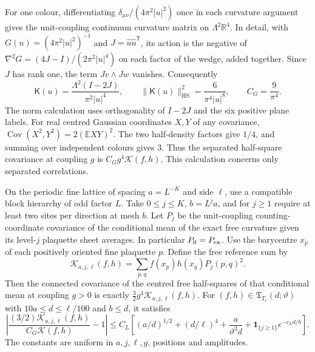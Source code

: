 \documentclass[11pt,letterpaper,reqno]{amsart}
\makeatletter
\numberwithin{equation}{section}
\theoremstyle{definition}
\newcommand{\ms@minorstart}{%
  \pushQED{\qed}\renewcommand{\qedsymbol}{$\blacksquare$}}
\newenvironment{proposition}[1][]{\ms@minorstart\ms@proposition[#1]}
  {\popQED\endms@proposition}
\theoremstyle{remark}
\makeatother
\begin{document}
For one colour, differentiating
\(\delta_{\mu\nu}/(4\pi^2|u|^2)\) once in each curvature argument
gives the unit-coupling continuum curvature matrix on
\(\Lambda^2\mathbb R^4\).
In detail, with \(G(u)=(4\pi^2|u|^2)^{-1}\) and
\(J=\widehat u\widehat u^{\mathsf T}\), its action is
the negative of \(\nabla^2G=(4J-I)/(2\pi^2|u|^4)\)
on each factor of the wedge, added together. Since \(J\)
has rank one, the term \(Jv\wedge Jw\) vanishes. Consequently
\begin{equation}\label{fp:eq-free-coefficient}
 \mathsf K(u)=\frac{\Lambda^2(I-2J)}{\pi^2|u|^4},\qquad
 \|\mathsf K(u)\|_{\mathrm{HS}}^2=\frac{6}{\pi^4|u|^8},\qquad
 C_G=\frac{9}{\pi^4}.
\end{equation}
The norm calculation uses orthogonality of \(I-2J\) and the six
positive plane labels. For real centred Gaussian coordinates \(X,Y\)
of any covariance, \(\operatorname{Cov}(X^2,Y^2)=2(\mathbb E XY)^2\).
The two half-density factors give \(1/4\), and summing over
independent colours gives \(3\). Thus the separated half-square
covariance at coupling \(g\) is \(C_Gg^4\mathcal K(f,h)\).
This calculation concerns only separated correlations.

\begin{proposition}[Free reference at a blocked scale]
\label{fp:prop-free-reference}
On the periodic fine lattice of spacing \(a=L^{-K}\) and side \(\ell\),
use a compatible block hierarchy of odd factor \(L\).
Take \(0\le j\le K\), \(b=L^ja\), and for \(j\ge1\) require at
least two sites per direction at mesh \(b\). Let \(P_j\) be
the unit-coupling counting-coordinate covariance of the
conditional mean of the exact free curvature given its
level-\(j\) plaquette sheet averages. In particular \(P_0=P_{\rm ex}\).
Use the barycentre \(x_p\) of each positively oriented fine
plaquette \(p\). Define the free reference sum by
\[
 \mathcal K_{a,j,\ell}(f,h)=
       \sum_{p,q}f(x_p)h(x_q)P_j(p,q)^2.
\]
Then the connected covariance of the centred free half-squares
of that conditional mean at coupling \(g>0\) is exactly
\(\tfrac32g^4\mathcal K_{a,j,\ell}(f,h)\).
For \((f,h)\in\mathfrak T_{T_\ell}(d;\vartheta)\) with
\(10a\le d\le\ell/100\) and \(b\le d\), it satisfies
\begin{equation}\label{fp:eq-free-reference-error}
 \left|\frac{(3/2)\mathcal K_{a,j,\ell}(f,h)}
                 {C_G\mathcal K(f,h)}-1\right|
 \le C_L\left[
     (a/d)^{1/2}+(d/\ell)^4+\frac{a}{\vartheta^3d}
     +\mathbf1_{\{j\ge1\}}e^{-c_Ld/b}\right].
\end{equation}
The constants are uniform in \(a,j,\ell,g\), positions and amplitudes.
\end{proposition}
\end{document}
